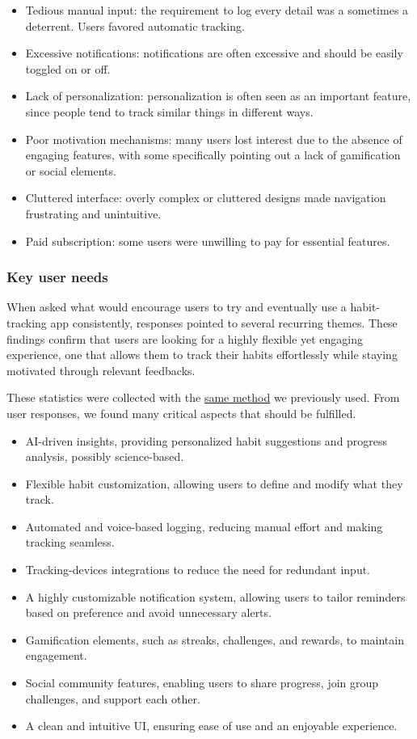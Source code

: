 \documentclass{article}
\begin{document}
\begin{itemize}
	\item Tedious manual input: the requirement to log every detail was a sometimes a deterrent. Users favored automatic tracking.
	\item Excessive notifications: notifications are often excessive and should be easily toggled on or off.
	\item Lack of personalization: personalization is often seen as an important feature, since people tend to track similar things in different ways.
	\item Poor motivation mechanisms: many users lost interest due to the absence of engaging features, with some specifically pointing out a lack of gamification or social elements.
	\item Cluttered interface: overly complex or cluttered designs made navigation frustrating and unintuitive.
	\item Paid subscription: some users were unwilling to pay for essential features.
\end{itemize}

\subsubsection{Key user needs}

When asked what would encourage users to try and eventually use a habit-tracking app consistently, responses pointed to several recurring themes.
These findings confirm that users are looking for a highly flexible yet engaging experience, one that allows them to track their habits effortlessly while staying motivated through relevant feedbacks.

These statistics were collected with the \hyperref[parag:stats-method]{same method} we previously used.
From user responses, we found many critical aspects that should be fulfilled.

\begin{itemize}
	\item AI-driven insights, providing personalized habit suggestions and progress analysis, possibly science-based.
	\item Flexible habit customization, allowing users to define and modify what they track.
	\item Automated and voice-based logging, reducing manual effort and making tracking seamless.
	\item Tracking-devices integrations to reduce the need for redundant input.
	\item A highly customizable notification system, allowing users to tailor reminders based on preference and avoid unnecessary alerts.
	\item Gamification elements, such as streaks, challenges, and rewards, to maintain engagement.
	\item Social community features, enabling users to share progress, join group challenges, and support each other.
	\item A clean and intuitive UI, ensuring ease of use and an enjoyable experience.
\end{itemize}
\end{document}

